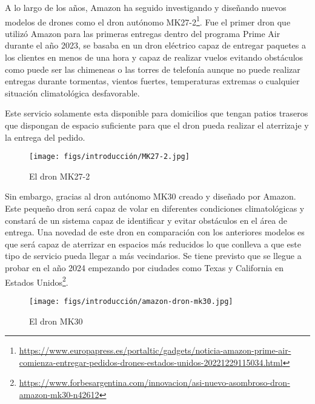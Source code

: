 A lo largo de los años, Amazon ha seguido investigando y diseñando nuevos modelos de drones como el dron autónomo MK27-2\footnote{\url{https://www.europapress.es/portaltic/gadgets/noticia-amazon-prime-air-comienza-entregar-pedidos-drones-estados-unidos-20221229115034.html}}. Fue el primer 
dron que utilizó Amazon para 
las primeras entregas dentro del programa Prime Air durante el año 2023, se basaba en un dron eléctrico capaz de entregar paquetes a los clientes en menos de una
hora y capaz de realizar vuelos evitando obstáculos como puede ser las chimeneas o las torres de telefonía aunque no puede realizar entregas durante tormentas, vientos fuertes, temperaturas
extremas o cualquier situación climatológica desfavorable. 

Este servicio solamente esta disponible para domicilios que tengan patios traseros que dispongan de espacio suficiente para que el dron pueda realizar el aterrizaje y la 
entrega del pedido.

\begin{figure} [H]
  \begin{center}
    \texttt{[image: figs/introducción/MK27-2.jpg]}
  \end{center}
  \caption{El dron MK27-2}
  \label{fig:MK27-2}
  \vspace{-1.5em}
\end{figure}

Sin embargo, gracias al dron autónomo MK30 creado y diseñado por Amazon. Este pequeño dron será capaz de volar en diferentes condiciones climatológicas y 
constará de un sistema capaz de identificar y evitar obstáculos en el área de entrega. Una novedad de este dron en comparación con los anteriores modelos es que será capaz de aterrizar en espacios más reducidos lo que conlleva a que
este tipo de servicio pueda llegar a más vecindarios. 
Se tiene previsto que se llegue a probar en el año 2024 empezando por ciudades como Texas y California en Estados Unidos\footnote{\url{https://www.forbesargentina.com/innovacion/asi-nuevo-asombroso-dron-amazon-mk30-n42612}}. 

\begin{figure} [H]
  \begin{center}
    \texttt{[image: figs/introducción/amazon-dron-mk30.jpg]}
  \end{center}
  \caption{El dron MK30}
  \label{fig:MK30}
  \vspace{-1.5em}
\end{figure}

